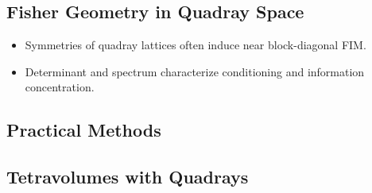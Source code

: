 \documentclass[
  10pt,
]{article}
\providecommand{\tightlist}{%
  \setlength{\itemsep}{0pt}\setlength{\parskip}{0pt}}
\begin{document}
\subsection{Fisher Geometry in Quadray
Space}\label{fisher-geometry-in-quadray-space}

\begin{itemize}
\tightlist
\item
  Symmetries of quadray lattices often induce near block-diagonal FIM.
\item
  Determinant and spectrum characterize conditioning and information
  concentration.
\end{itemize}

\subsection{Practical Methods}\label{practical-methods}

\subsection{Tetravolumes with Quadrays}\label{sec:tetravolumes_quadrays}
\end{document}
